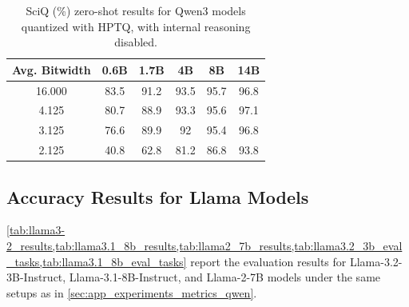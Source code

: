 \documentclass{article} %
\begin{document}
\begin{table}[htpb]
\caption{SciQ (\%) zero-shot results for Qwen3 models quantized with HPTQ, with internal reasoning disabled.}
\label{tab:all_sciq}
\begin{center}
\begin{tabular}{cccccc}
\toprule
Avg. Bitwidth & 0.6B & 1.7B & 4B & 8B & 14B \\
\midrule
16.000 & 83.5 & 91.2 & 93.5 & 95.7 & 96.8 \\
\midrule
4.125 & 80.7 & 88.9 & 93.3 & 95.6 & 97.1 \\
\midrule
3.125 & 76.6 & 89.9 & 92 & 95.4 & 96.8 \\
\midrule
2.125 & 40.8 & 62.8 & 81.2 & 86.8 & 93.8 \\
\bottomrule
\end{tabular}
\end{center}
\end{table}

\clearpage

\subsection{Accuracy Results for Llama Models}
\label{sec:app_experiments_metrics_llama}

\cref{tab:llama3-2_results,tab:llama3.1_8b_results,tab:llama2_7b_results,tab:llama3.2_3b_eval_tasks,tab:llama3.1_8b_eval_tasks} report the evaluation results for Llama-3.2-3B-Instruct, Llama-3.1-8B-Instruct, and Llama-2-7B models under the same setups as in \cref{sec:app_experiments_metrics_qwen}.
\end{document}
